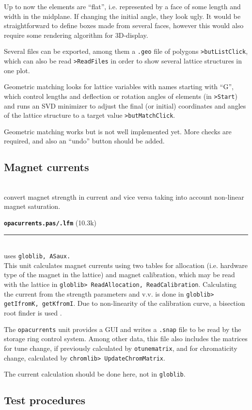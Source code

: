 \documentclass[12pt]{article}
\newcommand\code[1]{{\tt #1}}
\newcommand{\unico}[1]{{\color{burntorange}\code{#1}}}
\newcommand{\opagui}[1]{\colorbox{blue!20}{{\color{black}\code{#1}}}}
\newcommand{\oguih}[2]{\subsection{\label{#2}#1}{\Huge\opagui{#2}}\\}
\newcommand{\opauni}[1]{\colorbox{orange!30}{{\color{black}\code{#1}}}}
\newcommand{\ounih}[2]{\subsection{\label{#2}#1}{\Huge\opauni{#2}}\\}
\newcommand{\todo}[1]{{\color{red} #1}}
\newcommand\opamodule[3]{{\bf \tt #1} #2\\  \rule[3pt]{\textwidth}{0.2pt} \\ {\scriptsize uses \tt  #3}\\[1ex]}
\begin{document}
\todo{Up to now the elements are ``flat'', i.e. represented by a face of some length and width in the midplane. If changing the initial angle, they look ugly. It would be straightforward to define boxes made from several faces, however this would also require some rendering algorithm for 3D-display.}

Several files can be exported, among them a \code{.geo} file of polygons \code{>butListClick}, which can also be read \code{>ReadFiles} in order to show several lattice structures in one plot.

Geometric matching looks for lattice variables with names starting with ``G'', which control lengths and deflection or rotation angles of elements (in \code{>Start}) and runs an SVD minimizer to adjust the final (or initial) coordinates and angles of the lattice structure to a target value \code{>butMatchClick}.

\todo{Geometric matching works but is not well implemented yet. More checks are required, and also an ``undo'' button should be added.}




\oguih{Magnet currents}{opacurrents}

\unico{getKfromI, getdKdIfac, getIfromK} convert  magnet strength in current and vice versa taking into account non-linear magnet saturation.

\opamodule{opacurrents.pas/.lfm}{(10.3k)}{globlib, ASaux.}
This unit calculates magnet currents using two tables for allocation (i.e. hardware type of the magnet in the lattice) and magnet calibration, which may be read with the lattice in \code{globlib> ReadAllocation, ReadCalibration}. Calculating the current from the strength parameters and v.v. is done in \code{globlib> getIfromK, getKfromI}. Due to non-linearity of the calibration curve, a bisection root finder is used \cite{numrec}.

The {\tt opacurrents} unit provides a GUI and writes a {\tt .snap} file to be read by the storage ring control system. Among other data, this file also includes the matrices for tune change, if previously calculated by \code{otunematrix}, and for chromaticity change, calculated by \code{chromlib> UpdateChromMatrix}.

\todo{The current calculation should be done here, not in {\tt globlib}.}\\







\ounih{Test procedures}{testcode} 
\end{document}
